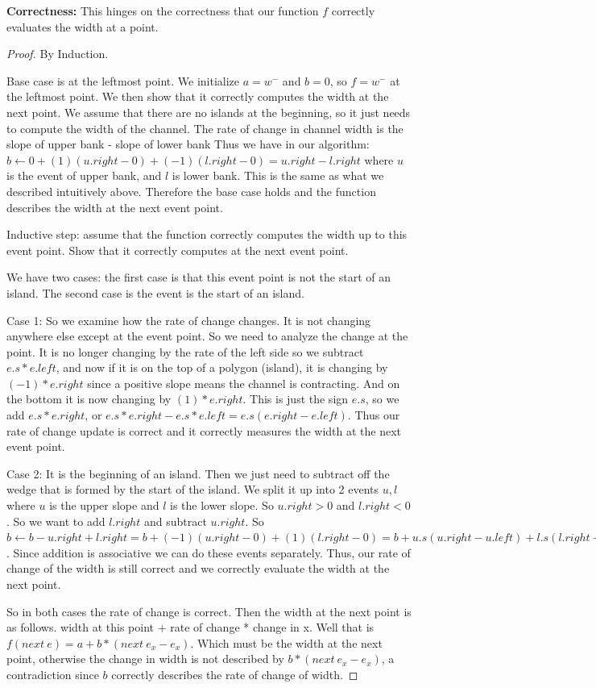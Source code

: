 \documentclass[11pt]{article}
\begin{document}
\textbf{Correctness:} 
This hinges on the correctness that our function $f$ correctly evaluates the width at a point.
\newpage
\begin{proof}
    By Induction.

    Base case is at the leftmost point. We initialize $a = w^-$ and $b = 0$, so $f = w^-$
    at the leftmost point. We then show that it correctly computes the width at the next point.
    We assume that there are no islands at the beginning, so it just needs to compute the width
    of the channel. The rate of change in channel width is the slope of upper bank - slope of lower bank
    Thus we have in our algorithm: $b \gets 0 + (1) (u.right - 0) + (-1)(l.right - 0) = u.right - l.right$
    where $u$ is the event of upper bank, and $l$ is lower bank. This is the same as what we described
    intuitively above. Therefore the base case holds and the function describes the width at the next event point.

    Inductive step: assume that the function correctly computes the width up to this event point.
    Show that it correctly computes at the next event point.

    We have two cases: the first case is that this event point is not the start of an island. The second case is the event is the start of an island.
    
    Case 1: So we examine how the rate of change changes. It is not changing anywhere else except at the event point.
    So we need to analyze the change at the point.
    It is no longer changing by the rate of the left side so
    we subtract $e.s * e.left$, and now if it is on the top of a polygon (island), it is changing by $(-1) * e.right$
    since a positive slope means the channel is contracting. And on the bottom it is now changing by $(1) * e.right$.
    This is just the sign $e.s$, so we add $e.s * e.right$, or $e.s * e.right - e.s *e.left = e.s(e.right - e.left)$.
    Thus our rate of change update is correct and it correctly measures the width at the next event point.

    Case 2: It is the beginning of an island. Then we just need to subtract off the wedge that is formed by the start of the island.
    We split it up into 2 events $u, l$ where $u$ is the upper slope and $l$ is the lower slope. 
    So $u.right > 0$ and $l.right < 0$. So we want to add $l.right$ and subtract $u.right$. So 
    $b \gets b - u.right + l.right = b + (-1) (u.right - 0) + (1) (l.right - 0) = b + u.s (u.right - u.left) + l.s (l.right - l.left)$.
    Since addition is associative we can do these events separately.
    Thus, our rate of change of the width is still correct and we correctly evaluate the width at the next point.

    So in both cases the rate of change is correct. Then the width at the next point is as follows.
    width at this point + rate of change * change in x. Well that is $f(next \: e) = a + b * (next \: e_x - e_x)$.
    Which must be the width at the next point, otherwise the change in width is not described by $b * (next \: e_x - e_x)$,
    a contradiction since $b$ correctly describes the rate of change of width.
\end{proof}
\end{document}
